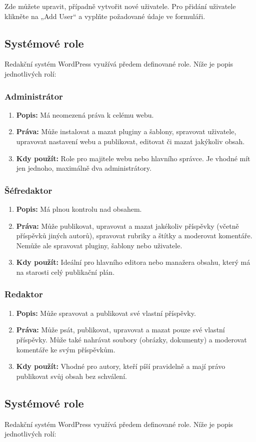 \documentclass[12pt,a4paper]{article}
\begin{document}
	\newpage
	Zde můžete upravit, případně vytvořit nové uživatele. Pro přidání uživatele klikněte na „Add User“ a vyplňte požadované údaje ve formuláři.
	
	\subsection{Systémové role}
	Redakční systém WordPress využívá předem definované role. Níže je popis jednotlivých rolí:
	
	\subsubsection*{Administrátor}
	\begin{enumerate}
		\item \textbf{Popis:} Má neomezená práva k celému webu.
		\item \textbf{Práva:} Může instalovat a mazat pluginy a šablony, spravovat uživatele, upravovat nastavení webu a publikovat, editovat či mazat jakýkoliv obsah.
		\item \textbf{Kdy použít:} Role pro majitele webu nebo hlavního správce. Je vhodné mít jen jednoho, maximálně dva administrátory.
	\end{enumerate}
	
	\subsubsection*{Šéfredaktor}
	\begin{enumerate}
		\item \textbf{Popis:} Má plnou kontrolu nad obsahem.
		\item \textbf{Práva:} Může publikovat, upravovat a mazat jakékoliv příspěvky (včetně příspěvků jiných autorů), spravovat rubriky a štítky a moderovat komentáře. Nemůže ale spravovat pluginy, šablony nebo uživatele.
		\item \textbf{Kdy použít:} Ideální pro hlavního editora nebo manažera obsahu, který má na starosti celý publikační plán.
	\end{enumerate}
	
	\subsubsection*{Redaktor}
	\begin{enumerate}
		\item \textbf{Popis:} Může spravovat a publikovat své vlastní příspěvky.
		\item \textbf{Práva:} Může psát, publikovat, upravovat a mazat pouze své vlastní příspěvky. Může také nahrávat soubory (obrázky, dokumenty) a moderovat komentáře ke svým příspěvkům.
		\item \textbf{Kdy použít:} Vhodné pro autory, kteří píší pravidelně a mají právo publikovat svůj obsah bez schválení.
	\end{enumerate}\subsection*{Systémové role}
	Redakční systém WordPress využívá předem definované role. Níže je popis jednotlivých rolí:
	
\end{document}
